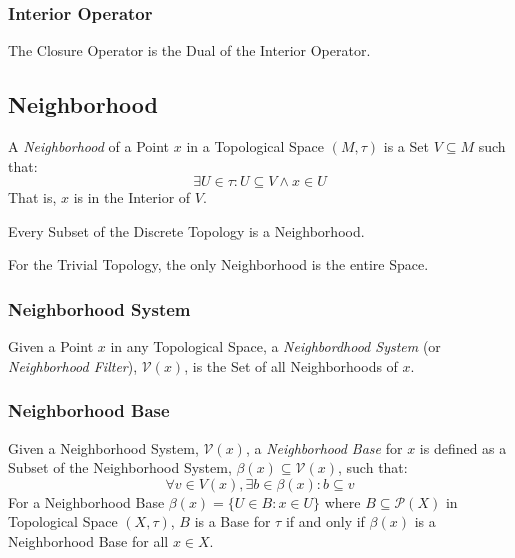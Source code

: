 \subsubsection{Interior Operator}\label{sec:interior_operator}

The Closure Operator is the Dual of the Interior Operator.



\subsection{Neighborhood}\label{sec:neighborhood}

A \emph{Neighborhood} of a Point $x$ in a Topological Space $(M,\tau)$
is a Set $V \subseteq M$ such that:
\[
  \exists U \in \tau : U \subseteq V \wedge x \in U
\]
That is, $x$ is in the Interior of $V$.

Every Subset of the Discrete Topology is a Neighborhood.

For the Trivial Topology, the only Neighborhood is the entire Space.



\subsubsection{Neighborhood System}\label{sec:neighborhood_system}

Given a Point $x$ in any Topological Space, a \emph{Neighbordhood
  System} (or \emph{Neighborhood Filter}), $\mathcal{V}(x)$, is the
Set of all Neighborhoods of $x$.



\subsubsection{Neighborhood Base}\label{sec:neighborhood_base}

Given a Neighborhood System, $\mathcal{V}(x)$, a \emph{Neighborhood
  Base} for $x$ is defined as a Subset of the Neighborhood System,
$\beta(x) \subseteq \mathcal{V}(x)$, such that:
\[
  \forall v \in V(x), \exists b \in \beta(x) : b \subseteq v
\]
For a Neighborhood Base $\beta(x) = \{ U \in B : x \in U \}$ where $B
\subseteq \mathcal{P}(X)$ in Topological Space $(X,\tau)$, $B$ is a
Base for $\tau$ if and only if $\beta(x)$ is a Neighborhood Base for
all $x \in X$.




